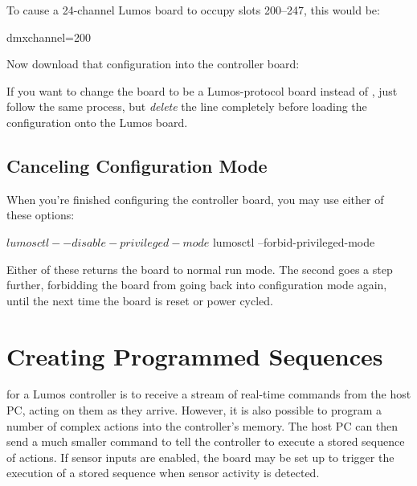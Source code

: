 \documentclass[letterpaper,twoside,onecolumn,openright,final]{memoir}
\begin{document}
To cause a 24-channel Lumos board to occupy  slots 200--247, this would be:
\begin{SourceCode}
dmxchannel=200
\end{SourceCode}

Now download that configuration into the controller board:

If you want to change the board to be a Lumos-protocol board instead of ,
just follow the same process, but \emph{delete} the  line completely
before loading the configuration onto the Lumos board.

\section{Canceling Configuration Mode}
When you're finished configuring the controller board, you may use either of these options:
\begin{SourceCode}
$ lumosctl --disable-privileged-mode
$ lumosctl --forbid-privileged-mode
\end{SourceCode}

Either of these returns the board to normal run mode.  The second goes a step further, forbidding
the board from going back into configuration mode again, until the next time the board is reset or
power cycled.

\chapter{Creating Programmed Sequences}\label{ch:sequences}
 for a Lumos controller is to receive a stream
of real-time commands from the host PC, acting on them as they arrive.  However, it is 
also possible to program a number of complex actions into the controller's memory.  The
host PC can then send a much smaller command to tell the controller to execute a stored
sequence of actions.  If sensor inputs are enabled, the board may be set up to trigger the
execution of a stored sequence when sensor activity is detected.

\end{document}
